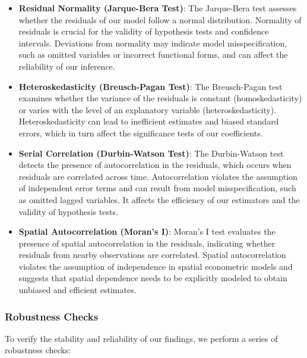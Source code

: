 \begin{itemize}
\setlength{\itemsep}{0pt}  %
\item \textbf{Residual Normality (Jarque-Bera Test)}: The Jarque-Bera test assesses whether the residuals of our model follow a normal distribution. Normality of residuals is crucial for the validity of hypothesis tests and confidence intervals. Deviations from normality may indicate model misspecification, such as omitted variables or incorrect functional forms, and can affect the reliability of our inference.

\item \textbf{Heteroskedasticity (Breusch-Pagan Test)}: The Breusch-Pagan test examines whether the variance of the residuals is constant (homoskedasticity) or varies with the level of an explanatory variable (heteroskedasticity). Heteroskedasticity can lead to inefficient estimates and biased standard errors, which in turn affect the significance tests of our coefficients.

\item \textbf{Serial Correlation (Durbin-Watson Test)}: The Durbin-Watson test detects the presence of autocorrelation in the residuals, which occurs when residuals are correlated across time. Autocorrelation violates the assumption of independent error terms and can result from model misspecification, such as omitted lagged variables. It affects the efficiency of our estimators and the validity of hypothesis tests.

\item \textbf{Spatial Autocorrelation (Moran's I)}: Moran's I test evaluates the presence of spatial autocorrelation in the residuals, indicating whether residuals from nearby observations are correlated. Spatial autocorrelation violates the assumption of independence in spatial econometric models and suggests that spatial dependence needs to be explicitly modeled to obtain unbiased and efficient estimates.
\end{itemize}

\subsubsection{Robustness Checks}
To verify the stability and reliability of our findings, we perform a series of robustness checks:

